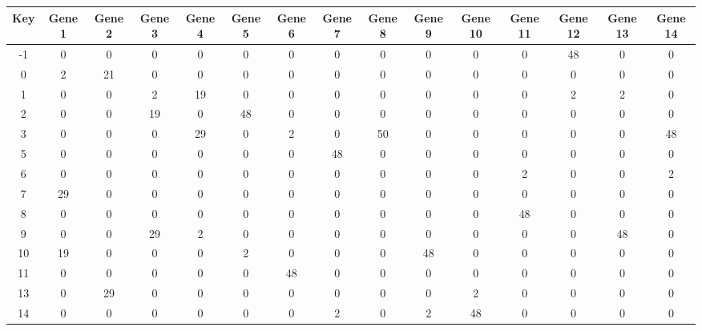 \begin{tabular}{|c|c|c|c|c|c|c|c|c|c|c|c|c|c|c|}
\hline
Key & Gene 1 & Gene 2 & Gene 3 & Gene 4 & Gene 5 & Gene 6 & Gene 7 & Gene 8 & Gene 9 & Gene 10 & Gene 11 & Gene 12 & Gene 13 & Gene 14 \\
\hline
-1 & 0 & 0 & 0 & 0 & 0 & 0 & 0 & 0 & 0 & 0 & 0 & 48 & 0 & 0 \\
0 & 2 & 21 & 0 & 0 & 0 & 0 & 0 & 0 & 0 & 0 & 0 & 0 & 0 & 0 \\
1 & 0 & 0 & 2 & 19 & 0 & 0 & 0 & 0 & 0 & 0 & 0 & 2 & 2 & 0 \\
2 & 0 & 0 & 19 & 0 & 48 & 0 & 0 & 0 & 0 & 0 & 0 & 0 & 0 & 0 \\
3 & 0 & 0 & 0 & 29 & 0 & 2 & 0 & 50 & 0 & 0 & 0 & 0 & 0 & 48 \\
5 & 0 & 0 & 0 & 0 & 0 & 0 & 48 & 0 & 0 & 0 & 0 & 0 & 0 & 0 \\
6 & 0 & 0 & 0 & 0 & 0 & 0 & 0 & 0 & 0 & 0 & 2 & 0 & 0 & 2 \\
7 & 29 & 0 & 0 & 0 & 0 & 0 & 0 & 0 & 0 & 0 & 0 & 0 & 0 & 0 \\
8 & 0 & 0 & 0 & 0 & 0 & 0 & 0 & 0 & 0 & 0 & 48 & 0 & 0 & 0 \\
9 & 0 & 0 & 29 & 2 & 0 & 0 & 0 & 0 & 0 & 0 & 0 & 0 & 48 & 0 \\
10 & 19 & 0 & 0 & 0 & 2 & 0 & 0 & 0 & 48 & 0 & 0 & 0 & 0 & 0 \\
11 & 0 & 0 & 0 & 0 & 0 & 48 & 0 & 0 & 0 & 0 & 0 & 0 & 0 & 0 \\
13 & 0 & 29 & 0 & 0 & 0 & 0 & 0 & 0 & 0 & 2 & 0 & 0 & 0 & 0 \\
14 & 0 & 0 & 0 & 0 & 0 & 0 & 2 & 0 & 2 & 48 & 0 & 0 & 0 & 0 \\
\hline
\end{tabular}